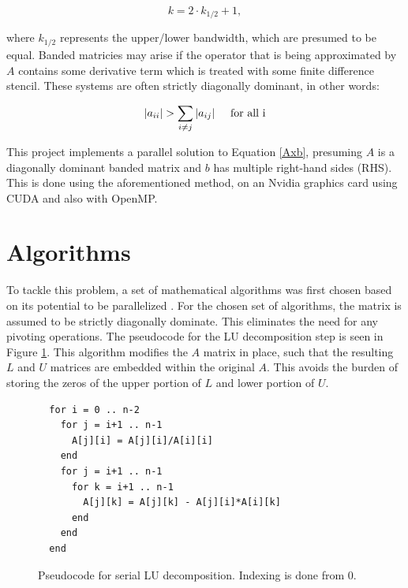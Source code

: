 \documentclass[12pt]{article}
\begin{document}
\begin{equation} 
\label{half_k} 
k = 2 \cdot k_{1/2} + 1, 
\end{equation} 

where $k_{1/2}$ represents the upper/lower bandwidth, which are presumed
to be equal. Banded matricies may arise if the operator that is being
approximated by $A$ contains some derivative term which is treated with some
finite difference stencil. These systems are often strictly diagonally
dominant, in other words:

\begin{equation}
|a_{ii}| > \sum\limits_{i \neq j} |a_{ij}| \hspace{0.5cm} \mbox{for all i}
\end{equation}


This project implements a parallel solution to Equation \ref{Axb}, presuming $A$
is a diagonally dominant banded matrix and $b$ has multiple right-hand sides (RHS).
This is done using the aforementioned method, on an Nvidia graphics card using
CUDA and also with OpenMP.


\section{Algorithms}
\label{sec:algorithms}

To tackle this problem, a set of mathematical algorithms was first chosen
based on its potential to be parallelized \cite{Heath}. For the chosen set of
algorithms, the matrix is assumed to be strictly diagonally dominate. This
eliminates the need for any pivoting operations. The pseudocode for the LU
decomposition step is seen in Figure \ref{LUcode}. This algorithm modifies the $A$
matrix in place, such that the resulting $L$ and $U$ matrices are embedded
within the original $A$. This avoids the burden of storing the zeros of the
upper portion of $L$ and lower portion of $U$. 

\begin{figure}[H]
\caption{Pseudocode for serial LU decomposition. Indexing is done from 0.}
\label{LUcode}
\begin{lstlisting}
  for i = 0 .. n-2
    for j = i+1 .. n-1
      A[j][i] = A[j][i]/A[i][i]
    end
    for j = i+1 .. n-1
      for k = i+1 .. n-1
        A[j][k] = A[j][k] - A[j][i]*A[i][k]
      end
    end
  end
\end{lstlisting}
\end{figure}
\end{document}
